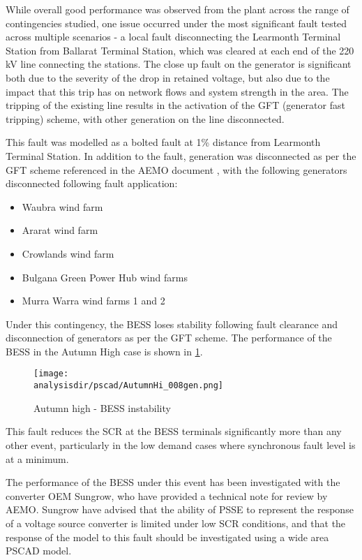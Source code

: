 \documentclass{../grid-link-report}
\newcommand{\analysisdir}{report-assets/analysis}
\begin{document}
		While overall good performance was observed from the plant across the range of contingencies studied, one issue occurred under the most significant fault tested across multiple scenarios - a local fault disconnecting the Learmonth Terminal Station from Ballarat Terminal Station, which was cleared at each end of the 220 kV line connecting the stations. The close up fault on the generator is significant both due to the severity of the drop in retained voltage, but also due to the impact that this trip has on network flows and system strength in the area. The tripping of the existing line results in the activation of the GFT (generator fast tripping) scheme, with other generation on the line disconnected.
		
		This fault was modelled as a bolted fault at 1\% distance from Learmonth Terminal Station. In addition to the fault, generation was disconnected as per the GFT scheme referenced in the AEMO document \cite{gft-scheme-doc}, with the following generators disconnected following fault application:
		
		\begin{itemize}
			\item Waubra wind farm
			\item Ararat wind farm
			\item Crowlands wind farm
			\item Bulgana Green Power Hub wind farms
			\item Murra Warra wind farms 1 and 2
		\end{itemize}
		
		Under this contingency, the BESS loses stability following fault clearance and disconnection of generators as per the GFT scheme. The performance of the BESS in the Autumn High case is shown in \ref{fig:bess-instability}.
		
		\begin{figure}[H]
			\centering
			\texttt{[image: \\analysisdir/pscad/AutumnHi\_008gen.png]}
			\caption{Autumn high - BESS instability}
			\label{fig:bess-instability}
		\end{figure}
		
		This fault reduces the SCR at the BESS terminals significantly more than any other event, particularly in the low demand cases where synchronous fault level is at a minimum. 
		
		The performance of the BESS under this event has been investigated with the converter OEM Sungrow, who have provided a technical note for review by AEMO. Sungrow have advised that the ability of PSSE to represent the response of a voltage source converter is limited under low SCR conditions, and that the response of the model to this fault should be investigated using a wide area PSCAD model. \cite{sungrow-response-learmonth-fault}
		
\end{document}
